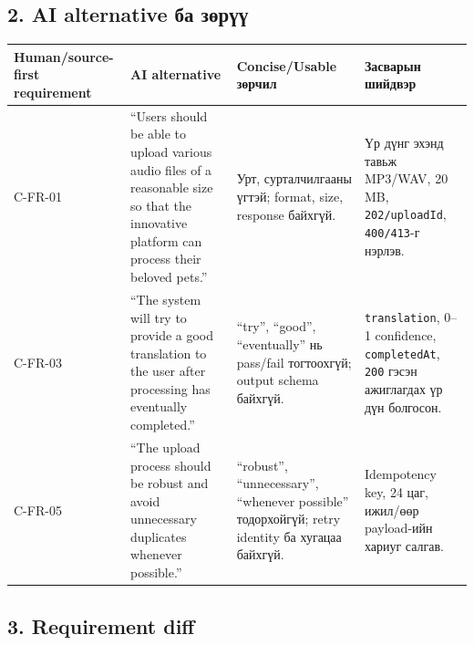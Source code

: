 \documentclass[
  mongolian,
]{article}
\begin{document}
\subsection{2. AI alternative ба
зөрүү}\label{ai-alternative-ux431ux430-ux437ux4e9ux440ux4afux4af}

\begin{longtable}[]{@{}
  >{\raggedright\arraybackslash}p{}
  >{\raggedright\arraybackslash}p{}
  >{\raggedright\arraybackslash}p{}
  >{\raggedright\arraybackslash}p{}@{}}
\toprule\noalign{}
\begin{minipage}[b]{\linewidth}\raggedright
Human/source-first requirement
\end{minipage} & \begin{minipage}[b]{\linewidth}\raggedright
AI alternative
\end{minipage} & \begin{minipage}[b]{\linewidth}\raggedright
Concise/Usable зөрчил
\end{minipage} & \begin{minipage}[b]{\linewidth}\raggedright
Засварын шийдвэр
\end{minipage} \\
\midrule\noalign{}
\endhead
\bottomrule\noalign{}
\endlastfoot
C-FR-01 & ``Users should be able to upload various audio files of a
reasonable size so that the innovative platform can process their
beloved pets.'' & Урт, сурталчилгааны үгтэй; format, size, response
байхгүй. & Үр дүнг эхэнд тавьж MP3/WAV, 20 MB, \texttt{202/uploadId},
\texttt{400/413}-г нэрлэв. \\
C-FR-03 & ``The system will try to provide a good translation to the
user after processing has eventually completed.'' & ``try'', ``good'',
``eventually'' нь pass/fail тогтоохгүй; output schema байхгүй. &
\texttt{translation}, 0--1 confidence, \texttt{completedAt},
\texttt{200} гэсэн ажиглагдах үр дүн болгосон. \\
C-FR-05 & ``The upload process should be robust and avoid unnecessary
duplicates whenever possible.'' & ``robust'', ``unnecessary'',
``whenever possible'' тодорхойгүй; retry identity ба хугацаа байхгүй. &
Idempotency key, 24 цаг, ижил/өөр payload-ийн хариуг салгав. \\
\end{longtable}

\subsection{3. Requirement diff}\label{requirement-diff}
\end{document}
